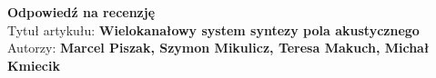 \documentclass[12pt]{article}
\begin{document}
    
    \begin{center}
        \textbf{Odpowiedź na recenzję }\\
        \vspace{10pt}
        Tytuł artykułu: \textbf{Wielokanałowy system syntezy pola akustycznego} \\
        Autorzy: \textbf{Marcel Piszak, Szymon Mikulicz, Teresa Makuch, Michał Kmiecik}
    \end{center}
    


    
    
\end{document}
